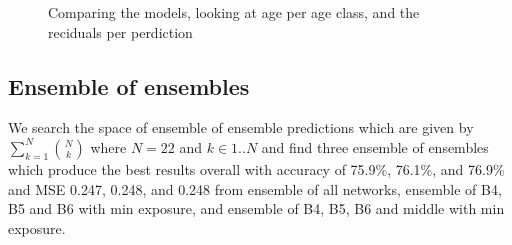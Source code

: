 \documentclass[10pt,letterpaper]{article}
\begin{document}
\begin{figure}
  \centering

  
  \caption{\label{ref_label_overall}Comparing the models, looking at age per age class, and the reciduals per perdiction}
  \label{marker7}
\end{figure}


\subsection*{Ensemble of ensembles}

We search the space of ensemble of ensemble predictions
which are given by 
$\sum_{k=1}^{N}\binom{N}{k} $ where $N=22$ and $k \in 1..N$
and find three ensemble of ensembles which produce the best
results overall with accuracy of 75.9\%, 76.1\%, and 76.9\%
and MSE 0.247, 0.248, and 0.248 from ensemble of 
all networks, ensemble of B4, B5 and B6 with min exposure,
and ensemble of B4, B5, B6 and middle with min exposure.
\end{document}
